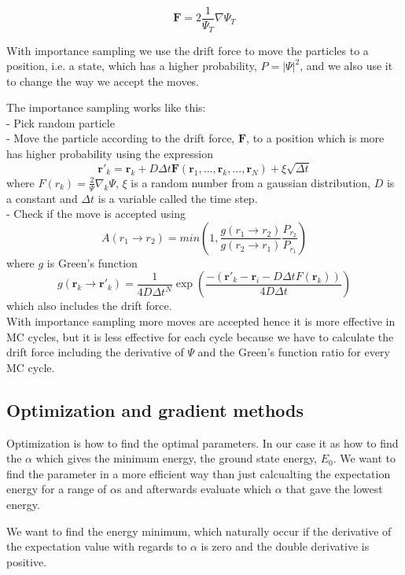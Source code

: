 $$ \mathbf{F} = 2 \frac{1}{\Psi_T} \nabla\Psi_T $$

With importance sampling we use the drift force to move the particles to a position, i.e. a state, which has a higher probability, $P = |\Psi|^2$, and we also use it to change the way we accept the moves. 

The importance sampling works like this:\\
- Pick random particle\\
- Move the particle according to the drift force, $\mathbf{F}$, to a position which is more has higher probability using the expression
$$ \mathbf{r}'_k = \mathbf{r}_k + D\Delta t \mathbf{F}(\mathbf{r}_1,...,\mathbf{r}_k,..., \mathbf{r}_N) + \xi \sqrt{\Delta t} $$
where $F(r_k) = \frac{2}{\Psi}\nabla_k\Psi$, $\xi$ is a random number from a gaussian distribution, $D$ is a constant and $\Delta t$ is a variable called the time step.\\
- Check if the move is accepted using
$$ A(r_1\rightarrow r_2) = min\left( 1, \frac{g(r_1\rightarrow r_2)}{g(r_2\rightarrow r_1)}\frac{P_{r_2}}{P_{r_1}}\right)$$
where $g$ is Green's function
$$ g(\mathbf{r}_k \rightarrow \mathbf{r}'_k) = \frac{1}{4 D \Delta t^N}\exp\left( \frac{-(\mathbf{r}'_k - \mathbf{r}_i - D\Delta tF(\mathbf{r}_k))}{4 D \Delta t}\right)$$ which also includes the drift force.\\

With importance sampling more moves are accepted hence it is more effective in MC cycles, but it is less effective for each cycle because we have to calculate the drift force including the derivative of $\Psi$ and the Green's function ratio for every MC cycle.

\subsection{Optimization and gradient methods}
Optimization is how to find the optimal parameters. In our case it as how to find the $\alpha$ which gives the minimum energy, the ground state energy, $E_0$. We want to find the parameter in a more efficient way than just calcualting the expectation energy for a range of $\alpha$s and afterwards evaluate which $\alpha$ that gave the lowest energy.

We want to find the energy minimum, which naturally occur if the derivative of the expectation value with regards to $\alpha$ is zero and the double derivative is positive.
